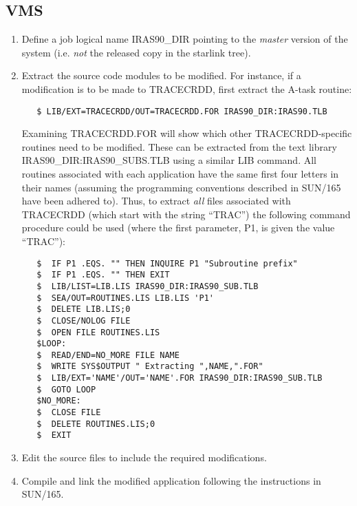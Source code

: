 \subsection{VMS}
\begin{enumerate}

\item Define a job logical name {\small IRAS90\_DIR} pointing to the
{\em master} version of the system (i.e. {\em not} the
released copy in the starlink tree).

\item Extract the source code modules to be modified. For instance, if a 
modification is to be made to {\small TRACECRDD}, first extract the A-task 
routine:

\small
\begin{verbatim}
   $ LIB/EXT=TRACECRDD/OUT=TRACECRDD.FOR IRAS90_DIR:IRAS90.TLB
\end{verbatim}
\normalsize

Examining {\small TRACECRDD.FOR} will show which other {\small
TRACECRDD}-specific routines need to be modified. These can be extracted from
the text library {\small IRAS90\_DIR:IRAS90\_SUBS.TLB} using a similar {\small
LIB} command. All routines associated with each application have the same first
four letters in their names (assuming the programming conventions described in
SUN/165 have been adhered to). Thus, to extract {\em all} files associated with
{\small TRACECRDD} (which start with the string ``TRAC'') the following command
procedure could be used (where the first parameter, P1, is given the value 
``{\small TRAC}''): 

\small
\begin{verbatim}
   $  IF P1 .EQS. "" THEN INQUIRE P1 "Subroutine prefix"
   $  IF P1 .EQS. "" THEN EXIT
   $  LIB/LIST=LIB.LIS IRAS90_DIR:IRAS90_SUB.TLB
   $  SEA/OUT=ROUTINES.LIS LIB.LIS 'P1'
   $  DELETE LIB.LIS;0
   $  CLOSE/NOLOG FILE
   $  OPEN FILE ROUTINES.LIS
   $LOOP:
   $  READ/END=NO_MORE FILE NAME
   $  WRITE SYS$OUTPUT " Extracting ",NAME,".FOR"
   $  LIB/EXT='NAME'/OUT='NAME'.FOR IRAS90_DIR:IRAS90_SUB.TLB
   $  GOTO LOOP
   $NO_MORE:
   $  CLOSE FILE
   $  DELETE ROUTINES.LIS;0
   $  EXIT
\end{verbatim}
\normalsize

\item Edit the source files to include the required modifications.

\item Compile and link the modified application following the instructions in SUN/165.


\end{enumerate}
